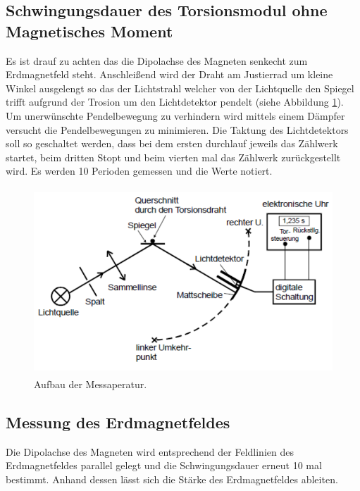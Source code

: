 \subsection{Schwingungsdauer des Torsionsmodul ohne Magnetisches Moment}
Es ist drauf zu achten das die Dipolachse des Magneten senkecht zum Erdmagnetfeld steht. Anschleißend wird der Draht am Justierrad um kleine Winkel ausgelengt so das der Lichtstrahl welcher von der Lichtquelle den Spiegel trifft aufgrund der Trosion um den Lichtdetektor pendelt (siehe Abbildung \ref{fig:Aufbau}). Um unerwünschte Pendelbewegung zu verhindern wird mittels einem Dämpfer versucht die Pendelbewegungen zu minimieren. Die Taktung des Lichtdetektors soll so geschaltet werden, dass bei dem ersten durchlauf jeweils das Zählwerk startet, beim dritten Stopt und beim vierten mal das Zählwerk zurückgestellt wird. Es werden 10 Perioden gemessen und die Werte notiert.
\begin{figure}
  \centering
  \includegraphics[height=7cm]{picture/Aufbau.png}
  \caption{Aufbau der Messaperatur.}
  \label{fig:Aufbau}
\end{figure}
\subsection{Messung des Erdmagnetfeldes}
Die Dipolachse des Magneten wird entsprechend der Feldlinien des Erdmagnetfeldes parallel gelegt und die Schwingungsdauer erneut 10 mal bestimmt. Anhand dessen lässt sich die Stärke des Erdmagnetfeldes ableiten.
